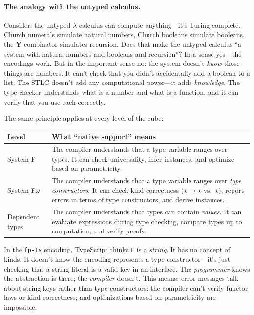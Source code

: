 \documentclass[11pt,a4paper]{article}
\theoremstyle{definition}
\newcommand{\lam}{\lambda}
\begin{document}
\paragraph{The analogy with the untyped calculus.}
Consider: the untyped $\lam$-calculus can compute anything---it's Turing
complete. Church numerals simulate natural numbers, Church booleans simulate
booleans, the $\mathbf{Y}$ combinator simulates recursion. Does that make the
untyped calculus ``a system with natural numbers and booleans and recursion''?
In a sense yes---the encodings work. But in the important sense no: the system
doesn't \emph{know} those things are numbers. It can't check that you didn't
accidentally add a boolean to a list. The STLC doesn't add any computational
power---it adds \emph{knowledge}. The type checker understands what is a number
and what is a function, and it can verify that you use each correctly.

The same principle applies at every level of the cube:

\begin{center}
\renewcommand{\arraystretch}{1.4}
\begin{tabular}{p{4cm}p{9cm}}
\textbf{Level} & \textbf{What ``native support'' means} \\
\hline
System F & The compiler understands that a type variable ranges over
  types. It can check universality, infer instances, and optimize based on
  parametricity. \\
System F$\omega$ & The compiler understands that a type variable ranges over
  \emph{type constructors}. It can check kind correctness ($\star \to \star$
  vs.\ $\star$), report errors in terms of type constructors, and derive
  instances. \\
Dependent types & The compiler understands that types can contain
  \emph{values}. It can evaluate expressions during type checking, compare
  types up to computation, and verify proofs. \\
\end{tabular}
\end{center}

In the \texttt{fp-ts} encoding, TypeScript thinks \texttt{F} is a
\emph{string}. It has no concept of kinds. It doesn't know the encoding
represents a type constructor---it's just checking that a string literal is a
valid key in an interface. The \emph{programmer} knows the abstraction is
there; the \emph{compiler} doesn't. This means: error messages talk about
string keys rather than type constructors; the compiler can't verify functor
laws or kind correctness; and optimizations based on parametricity are
impossible.
\end{document}

